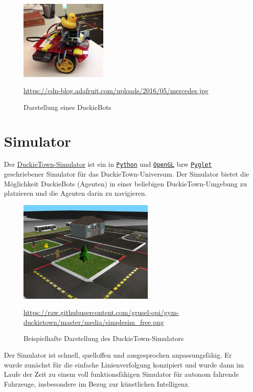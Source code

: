 \begin{figure}[H]
	\centering
	\includegraphics[width=0.385\textwidth]{kapitel2/images/duckiebot.jpg}
	\label{fig:duckiebot}
	\caption{Darstellung eines DuckieBots}
	\vspace{0.2cm}
	\quelle\url{https://cdn-blog.adafruit.com/uploads/2016/05/mercedes.jpg}
\end{figure}


\section{Simulator}

Der \href{https://github.com/duckietown/gym-duckietown}{DuckieTown-Simulator} ist ein in \href{https://www.python.org/}{\texttt{Python}} und \href{https://www.opengl.org/}{\texttt{OpenGL}} \acf{bzw} \href{http://pyglet.org/}{\texttt{Pyglet}} geschriebener Simulator für das \glqq DuckieTown-Universum\grqq. Der Simulator bietet die Möglichkeit DuckieBots (Agenten) in einer beliebigen DuckieTown-Umgebung zu platzieren und die Agenten darin zu navigieren. \cite{gym_duckietown} \\

\begin{figure}[H]
	\centering
	\includegraphics[width=0.6\textwidth]{kapitel2/images/duckietown-gym.png}
	\label{fig:duckietown-gym}
	\caption{Beispielhafte Darstellung des DuckieTown-Simulators}
	\vspace{0.2cm}
	\quelle\url{https://raw.githubusercontent.com/grusel-opi/gym-duckietown/master/media/simplesim_free.png}
\end{figure}

Der Simulator ist schnell, quelloffen und ausgesprochen anpassungsfähig. Er wurde zunächst für die einfache Linienverfolgung konzipiert und wurde dann im Laufe der Zeit zu einem voll funktionsfähigen Simulator für autonom fahrende Fahrzeuge, insbesondere im Bezug zur künstlichen Intelligenz. \cite{gym_duckietown}

